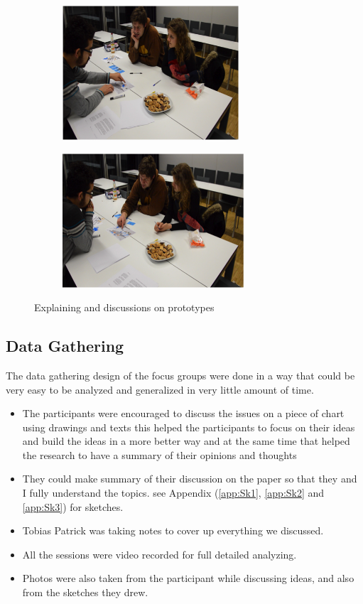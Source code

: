 \begin{figure}[H]
    \centering
    \begin{subfigure}[H]{0.45\textwidth}
        \centering
        \includegraphics[width=\textwidth,height=5cm]{Figures/4/show_map}
        \caption{}
        \label{fig:showmap}
    \end{subfigure}
    \begin{subfigure}[H]{0.45\textwidth}
        \centering
        \includegraphics[width=\textwidth,height=5cm]{Figures/4/tell_map}
        \caption{}
        \label{fig:tell_map}
    \end{subfigure}
    \caption{Explaining and discussions on prototypes }
    \label{fig:explaining_and_discussion}
\end{figure}

\subsection{Data Gathering}
The data gathering design of the focus groups were done in a way that could be very easy to be analyzed and generalized in very little amount of time. 


\begin {itemize}
\item   The participants were encouraged to discuss the issues on a piece of chart using drawings and texts this helped the participants to focus on their ideas and build the ideas in a more better way and at the same time that helped the research to have a summary of their opinions and thoughts 
\item   They could make summary of their discussion on the paper so that they and I fully understand the topics. see Appendix (\ref{app:Sk1}, \ref{app:Sk2} and \ref{app:Sk3}) for sketches.
\item   Tobias Patrick was taking notes to cover up everything we discussed.
\item   All the sessions were video recorded for full detailed analyzing. 
\item Photos were also taken from the participant while discussing ideas, and also from the sketches they drew.
\end{itemize}


